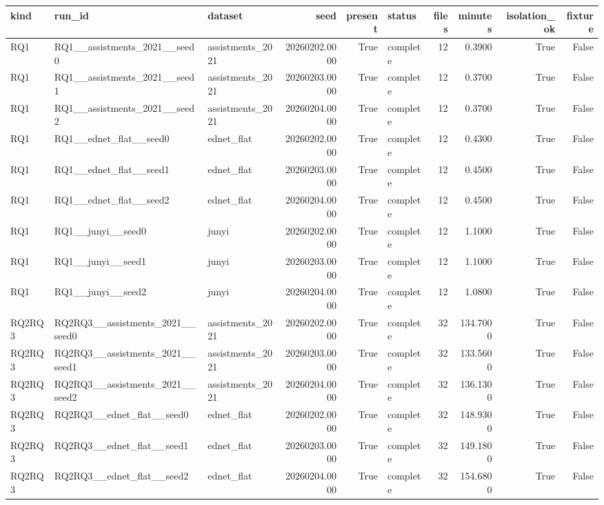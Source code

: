 \begin{tabular}{lllrrlrrrr}
\toprule
kind & run\_id & dataset & seed & present & status & files & minutes & isolation\_ok & fixture \\
\midrule
RQ1 & RQ1\_\_assistments\_2021\_\_seed0 & assistments\_2021 & 20260202.0000 & True & complete & 12 & 0.3900 & True & False \\
RQ1 & RQ1\_\_assistments\_2021\_\_seed1 & assistments\_2021 & 20260203.0000 & True & complete & 12 & 0.3700 & True & False \\
RQ1 & RQ1\_\_assistments\_2021\_\_seed2 & assistments\_2021 & 20260204.0000 & True & complete & 12 & 0.3700 & True & False \\
RQ1 & RQ1\_\_ednet\_flat\_\_seed0 & ednet\_flat & 20260202.0000 & True & complete & 12 & 0.4300 & True & False \\
RQ1 & RQ1\_\_ednet\_flat\_\_seed1 & ednet\_flat & 20260203.0000 & True & complete & 12 & 0.4500 & True & False \\
RQ1 & RQ1\_\_ednet\_flat\_\_seed2 & ednet\_flat & 20260204.0000 & True & complete & 12 & 0.4500 & True & False \\
RQ1 & RQ1\_\_junyi\_\_seed0 & junyi & 20260202.0000 & True & complete & 12 & 1.1000 & True & False \\
RQ1 & RQ1\_\_junyi\_\_seed1 & junyi & 20260203.0000 & True & complete & 12 & 1.1000 & True & False \\
RQ1 & RQ1\_\_junyi\_\_seed2 & junyi & 20260204.0000 & True & complete & 12 & 1.0800 & True & False \\
RQ2RQ3 & RQ2RQ3\_\_assistments\_2021\_\_seed0 & assistments\_2021 & 20260202.0000 & True & complete & 32 & 134.7000 & True & False \\
RQ2RQ3 & RQ2RQ3\_\_assistments\_2021\_\_seed1 & assistments\_2021 & 20260203.0000 & True & complete & 32 & 133.5600 & True & False \\
RQ2RQ3 & RQ2RQ3\_\_assistments\_2021\_\_seed2 & assistments\_2021 & 20260204.0000 & True & complete & 32 & 136.1300 & True & False \\
RQ2RQ3 & RQ2RQ3\_\_ednet\_flat\_\_seed0 & ednet\_flat & 20260202.0000 & True & complete & 32 & 148.9300 & True & False \\
RQ2RQ3 & RQ2RQ3\_\_ednet\_flat\_\_seed1 & ednet\_flat & 20260203.0000 & True & complete & 32 & 149.1800 & True & False \\
RQ2RQ3 & RQ2RQ3\_\_ednet\_flat\_\_seed2 & ednet\_flat & 20260204.0000 & True & complete & 32 & 154.6800 & True & False \\

\end{tabular}
